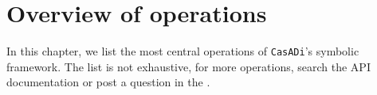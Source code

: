 \documentclass[a4paper,12pt]{book}
\newcommand{\CasADi}{\texttt{CasADi}\xspace}
\begin{document}
\chapter{Overview of operations}
In this chapter, we list the most central operations of \CasADi's symbolic framework. The list is not exhaustive, for more operations, search the API documentation or post a question in the .

\end{document}
